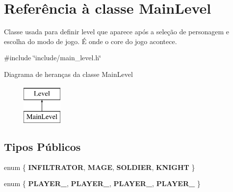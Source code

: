 \hypertarget{classMainLevel}{}\section{Referência à classe Main\+Level}
\label{classMainLevel}


Classe usada para definir level que aparece após a seleção de personagem e escolha do modo de jogo. É onde o core do jogo acontece.  




{\ttfamily \#include \char`\"{}include/main\+\_\+level.\+h\char`\"{}}

Diagrama de heranças da classe Main\+Level\begin{figure}[H]
\begin{center}
\leavevmode
\includegraphics[height=2.000000cm]{classMainLevel}
\end{center}
\end{figure}
\subsection*{Tipos Públicos}
\begin{DoxyCompactItemize}
\item 
\mbox{\label{classMainLevel_a19d15012888b099ef2d53e1a0e7d1b97}} 
enum \{ {\bfseries I\+N\+F\+I\+L\+T\+R\+A\+T\+OR}, 
{\bfseries M\+A\+GE}, 
{\bfseries S\+O\+L\+D\+I\+ER}, 
{\bfseries K\+N\+I\+G\+HT}
 \}
\item 
\mbox{\label{classMainLevel_a25d9f3e3c424008626bd8bfc5c3e9dac}} 
enum \{ {\bfseries P\+L\+A\+Y\+E\+R\+\_}, 
{\bfseries P\+L\+A\+Y\+E\+R\+\_}, 
{\bfseries P\+L\+A\+Y\+E\+R\+\_}, 
{\bfseries P\+L\+A\+Y\+E\+R\+\_}
 \}
\end{DoxyCompactItemize}
